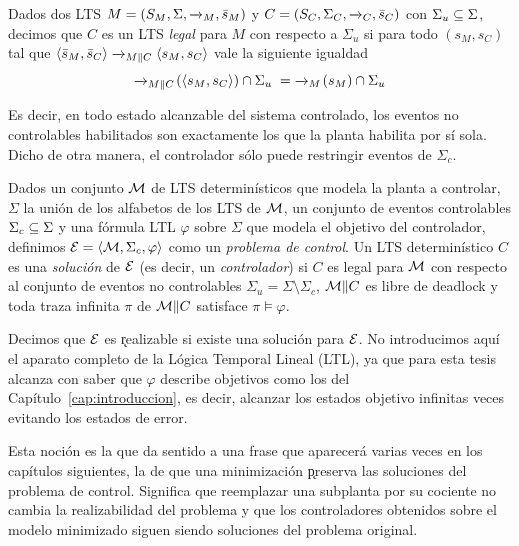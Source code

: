 \begin{definition}
\label{def:legal}
Dados dos LTS $M = (S_M, \Sigma, \pijl{}_{M}, \init{s}_M)$ y
$C = (S_C, \Sigma_C, \pijl{}_{C}, \init{s}_C)$ con $\Sigma_u \subseteq \Sigma$, decimos que $C$ es un
LTS \textit{legal} para $M$ con respecto a $\Sigma_u$ si para todo $(s_M, s_C)$ tal que
$\<\init{s}_M, \init{s}_C\> \pijl{}_{M\|C} \<s_M, s_C\>$ vale la siguiente igualdad
\[
\pijl{}_{M\|C}\!(\<s_M, s_C\>) \cap \Sigma_u \;=\; \pijl{}_M\!(s_M) \cap \Sigma_u
\]
\end{definition}

Es decir, en todo estado alcanzable del sistema controlado, los eventos no controlables
habilitados son exactamente los que la planta habilita por sí sola. Dicho de otra manera, el
controlador sólo puede restringir eventos de $\Sigma_c$.

\begin{definition}
\label{def:control}
Dados un conjunto $\mathcal{M}$ de LTS determinísticos que modela la planta a controlar, $\Sigma$ la
unión de los alfabetos de los LTS de $\mathcal{M}$, un conjunto de eventos controlables
$\Sigma_c \subseteq \Sigma$ y una fórmula LTL $\varphi$ sobre $\Sigma$ que modela el objetivo del
controlador, definimos $\mathcal{E} = \langle\mathcal{M}, \Sigma_c, \varphi\rangle$ como un \textit{problema de control}.
Un LTS determinístico $C$ es una \textit{solución} de $\mathcal{E}$ (es decir, un \textit{controlador})
si $C$ es legal para $\mathcal{M}$ con respecto al conjunto de eventos no controlables
$\Sigma_u = \Sigma \setminus \Sigma_c$, $\mathcal{M} \| C$ es libre de deadlock y toda traza infinita
$\pi$ de $\mathcal{M} \| C$ satisface $\pi \vDash \varphi$.
\end{definition}

Decimos que $\mathcal{E}$ es \k{realizable} si existe una solución para $\mathcal{E}$. No introducimos aquí el
aparato completo de la Lógica Temporal Lineal (LTL), ya que para esta tesis alcanza con saber
que $\varphi$ describe objetivos como los del Capítulo~\ref{cap:introduccion}, es decir,
alcanzar los estados objetivo infinitas veces evitando los estados de error.

Esta noción es la que da sentido a una frase que aparecerá varias veces en los capítulos
siguientes, la de que una minimización \k{preserva las soluciones} del problema de control.
Significa que reemplazar una subplanta por su cociente no cambia la realizabilidad del
problema y que los controladores obtenidos sobre el modelo minimizado siguen siendo soluciones del
problema original.

